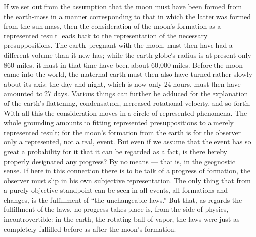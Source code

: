 \documentclass[12pt]{book}
\begin{document}
If we set out from the assumption that the moon must have been formed from the
earth-mass in a manner corresponding to that in which the latter was formed from the
sun-mass, then the consideration of the moon's formation as a represented result leads
back to the representation of the necessary presuppositions. The earth, pregnant with the
moon, must then have had a different volume than it now has; while the earth-globe's
radius is at present only 860 miles, it must in that time have been about 60,000 miles.
Before the moon came into the world, the maternal earth must then also have turned rather
slowly about its axis: the day-and-night, which is now only 24 hours, must then have
amounted to 27 days. Various things can further be adduced for the explanation of the
earth's flattening, condensation, increased rotational velocity, and so forth. With all
this the consideration moves in a circle of represented phenomena. The whole grounding
amounts to fitting represented presuppositions to a merely represented result; for the
moon's formation from the earth is for the observer only a represented, not a real,
event. But even if we assume that the event has so great a probability for it that it can
be regarded as a fact, is there hereby properly designated any progress? By no means ---
that is, in the geognostic sense. If here in this connection there is to be talk of a
progress of formation, the observer must slip in his own subjective representation. The
only thing that from a purely objective standpoint can be seen in all events, all
formations and changes, is the fulfillment of ``the unchangeable laws.'' But that, as
regards the fulfillment of the laws, no progress takes place is, from the side of physics,
incontrovertible: in the earth, the rotating ball of vapor, the laws were just as
completely fulfilled before as after the moon's formation.
\end{document}
